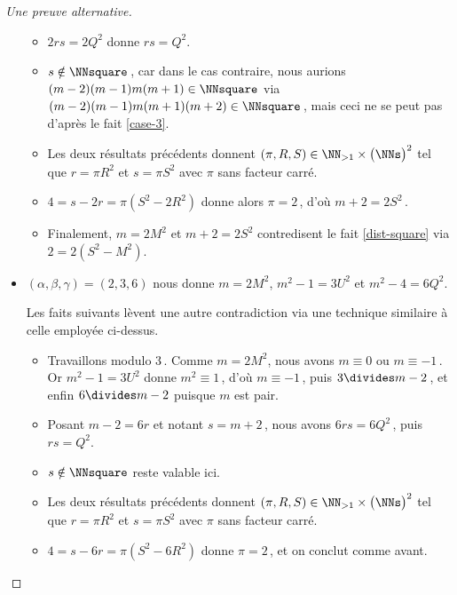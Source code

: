 \begin{proof}[Une preuve alternative]
\begin{itemize}
		\newpage
		\begin{itemize}
			\item $2 r s = 2 Q^2$ donne $r s = Q^2$.
			
			\item $s \notin \NNsquare$\,, car dans le cas contraire, nous aurions $(m-2)(m-1)m(m+1) \in \NNsquare$ via $(m-2)(m-1)m(m+1)(m+2)  \in \NNsquare$\,, mais ceci ne se peut pas d'après le fait \ref{case-3}.
			
			\item Les deux résultats précédents donnent $(\pi, R, S) \in \NN_{>1} \times \big( \NNs \big)^2$ tel que $r = \pi R^2$ et $s = \pi S^2$ avec $\pi$ sans facteur carré.
			
			\item $4 = s - 2r = \pi (S^2 - 2 R^2)$ donne alors $\pi = 2$\,, d'où $m + 2 = 2 S^2$\,.
			
			\item Finalement, $m = 2 M^2$ et $m + 2 = 2 S^2$ contredisent le fait \ref{dist-square} via $2 = 2(S^2 - M^2)$.
		\end{itemize}



		\item $(\alpha, \beta, \gamma) = (2, 3, 6)$ nous donne $m = 2 M^2$, $m^2 - 1 = 3 U^2$ et $m^2 - 4 = 6 Q^2$.
		
		\noindent
		Les faits suivants lèvent une autre contradiction via une technique similaire à celle employée ci-dessus.
		\begin{itemize}
			\item Travaillons modulo $3$\,.
			Comme $m = 2 M^2$, nous avons $m \equiv 0$ ou $m \equiv -1$\,. 
			Or $m^2 - 1 = 3 U^2$ donne $m^2 \equiv 1$\,, d'où $m \equiv -1$\,, puis $3 \divides m - 2$\,, et enfin $6 \divides m - 2$ puisque $m$ est pair.
			
			\item Posant $m - 2 = 6 r$ et notant $s = m + 2$\,, nous avons $6 r s = 6 Q^2$\,, puis $r s = Q^2$.
			
			\item $s \notin \NNsquare$ reste valable ici.
			
			\item Les deux résultats précédents donnent $(\pi, R, S) \in \NN_{>1} \times \big( \NNs \big)^2$ tel que $r = \pi R^2$ et $s = \pi S^2$ avec $\pi$ sans facteur carré.
			
			\item $4 = s - 6r = \pi (S^2 - 6 R^2)$ donne $\pi = 2$\,, et on conclut comme avant. \qedhere
		\end{itemize} \qedhere
	\end{itemize}
\end{proof}
